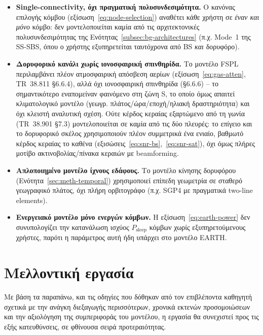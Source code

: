 \begin{itemize}
  \item \textbf{Single-connectivity, όχι πραγματική πολυσυνδεσιμότητα.}
    Ο κανόνας επιλογής κόμβου (εξίσωση~\eqref{eq:node-selection}) αναθέτει
    κάθε χρήστη σε \emph{έναν και μόνο} κόμβο: δεν μοντελοποιείται καμία
    από τις αρχιτεκτονικές πολυσυνδεσιμότητας της
    Ενότητας~\ref{subsec:bg-architectures} (π.χ. Mode~1 της SS-SBS, όπου ο
    χρήστης εξυπηρετείται ταυτόχρονα από BS \emph{και} δορυφόρο).
  \item \textbf{Δορυφορικό κανάλι χωρίς ιονοσφαιρική σπινθηρίδα.} Το
    μοντέλο FSPL περιλαμβάνει πλέον ατμοσφαιρική απόσβεση αερίων
    (εξίσωση~\eqref{eq:gas-atten}, TR~38.811 §6.6.4), αλλά όχι
    ιονοσφαιρική σπινθηρίδα (§6.6.6) -- το σημαντικότερο εναπομείναν
    φαινόμενο στη ζώνη S, το οποίο όμως απαιτεί κλιματολογικό μοντέλο
    (γεωγρ. πλάτος/ώρα/εποχή/ηλιακή δραστηριότητα) και όχι κλειστή
    αναλυτική σχέση. Ούτε κέρδος κεραίας εξαρτώμενο από τη γωνία
    (TR~38.901 §7.3) μοντελοποιείται σε καμία από τις δύο πλευρές: το
    επίγειο και το δορυφορικό σκέλος χρησιμοποιούν πλέον συμμετρικά ένα
    ενιαίο, βαθμωτό κέρδος κεραίας το καθένα
    (εξισώσεις~\eqref{eq:snr-bs},~\eqref{eq:snr-sat}), όχι όμως πλήρες
    μοτίβο ακτινοβολίας/πίνακα κεραιών με beamforming.
  \item \textbf{Απλοποιημένο μοντέλο ίχνους εδάφους.} Το μοντέλο κίνησης
    δορυφόρου (Ενότητα~\ref{sec:meth-temporal}) χρησιμοποιεί επίπεδη
    γεωμετρία σε σταθερό γεωγραφικό πλάτος, όχι πλήρη ορβιτογράφο (π.χ.
    SGP4 με πραγματικά two-line elements).
  \item \textbf{Ενεργειακό μοντέλο μόνο ενεργών κόμβων.} Η
    εξίσωση~\eqref{eq:earth-power} δεν συνυπολογίζει την κατανάλωση
    ισχύος $P_{\text{sleep}}$ κόμβων χωρίς εξυπηρετούμενους χρήστες,
    παρότι η παράμετρος αυτή ήδη υπάρχει στο μοντέλο EARTH.
\end{itemize}

\section{Μελλοντική εργασία}
\label{sec:disc-future-work}

Με βάση τα παραπάνω, και τις οδηγίες που δόθηκαν από τον επιβλέποντα
καθηγητή σχετικά με την ανάγκη διεξαγωγής περισσότερων, χρονικά εκτενών
προσομοιώσεων και την αξιολόγηση της συμπεριφοράς του μοντέλου, η εργασία
θα συνεχιστεί προς τις εξής κατευθύνσεις, σε φθίνουσα σειρά προτεραιότητας.

